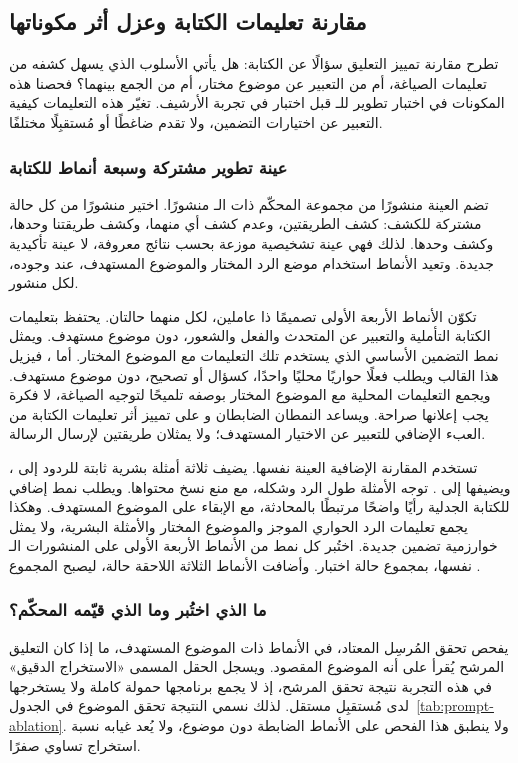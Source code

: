 \subsection{مقارنة تعليمات الكتابة وعزل أثر مكوناتها}
\label{sec:prompt-ablation}

تطرح مقارنة تمييز التعليق سؤالًا عن الكتابة: هل يأتي الأسلوب الذي يسهل كشفه من تعليمات الصياغة، أم من التعبير عن موضوع مختار، أم من الجمع بينهما؟ فحصنا هذه المكونات في اختبار تطوير للـ قبل اختبار  في تجربة الأرشيف. تغيّر هذه التعليمات كيفية التعبير عن اختيارات التضمين، ولا تقدم ضاغطًا أو مُستقبِلًا مختلفًا.

\subsubsection{عينة تطوير مشتركة وسبعة أنماط للكتابة}
تضم العينة \NUM{\PaPosts} منشورًا من مجموعة المحكّم ذات الـ منشورًا. اختير \NUM{\PaStratumPosts} منشورًا من كل حالة مشتركة للكشف: كشف الطريقتين، وعدم كشف أي منهما، وكشف طريقتنا وحدها، وكشف  وحدها. لذلك فهي عينة تشخيصية موزعة بحسب نتائج معروفة، لا عينة تأكيدية جديدة. وتعيد الأنماط استخدام موضع الرد المختار والموضوع المستهدف، عند وجوده، لكل منشور.

تكوّن الأنماط الأربعة الأولى تصميمًا ذا عاملين، لكل منهما حالتان. يحتفظ  بتعليمات الكتابة التأملية والتعبير عن المتحدث والفعل والشعور، دون موضوع مستهدف. ويمثل  نمط التضمين الأساسي الذي يستخدم تلك التعليمات مع الموضوع المختار. أما ، فيزيل هذا القالب ويطلب فعلًا حواريًا محليًا واحدًا، كسؤال أو تصحيح، دون موضوع مستهدف. ويجمع  التعليمات المحلية مع الموضوع المختار بوصفه تلميحًا لتوجيه الصياغة، لا فكرة يجب إعلانها صراحة. ويساعد النمطان الضابطان  و على تمييز أثر تعليمات الكتابة من العبء الإضافي للتعبير عن الاختيار المستهدف؛ ولا يمثلان طريقتين لإرسال الرسالة.

تستخدم المقارنة الإضافية العينة نفسها. يضيف  ثلاثة أمثلة بشرية ثابتة للردود إلى ، ويضيفها  إلى . توجه الأمثلة طول الرد وشكله، مع منع نسخ محتواها. ويطلب نمط إضافي للكتابة الجدلية رأيًا واضحًا مرتبطًا بالمحادثة، مع الإبقاء على الموضوع المستهدف. وهكذا يجمع  تعليمات الرد الحواري الموجز والموضوع المختار والأمثلة البشرية، ولا يمثل خوارزمية تضمين جديدة. اختُبر كل نمط من الأنماط الأربعة الأولى على المنشورات الـ\NUM{\PaPosts} نفسها، بمجموع \NUM{\PaPrimaryAttempts} حالة اختبار. وأضافت الأنماط الثلاثة اللاحقة \NUM{\PaExtensionAttempts} حالة، ليصبح المجموع \NUM{\PaGenerationAttempts}.

\subsubsection{ما الذي اختُبر وما الذي قيّمه المحكّم؟}
يفحص تحقق المُرسِل المعتاد، في الأنماط ذات الموضوع المستهدف، ما إذا كان التعليق المرشح يُقرأ على أنه الموضوع المقصود. ويسجل الحقل المسمى «الاستخراج الدقيق» في هذه التجربة نتيجة تحقق المرشح، إذ لا يجمع برنامجها حمولة كاملة ولا يستخرجها لدى مُستقبِل مستقل. لذلك نسمي النتيجة تحقق الموضوع في الجدول~\ref{tab:prompt-ablation}. ولا ينطبق هذا الفحص على الأنماط الضابطة دون موضوع، ولا يُعد غيابه نسبة استخراج تساوي صفرًا.


